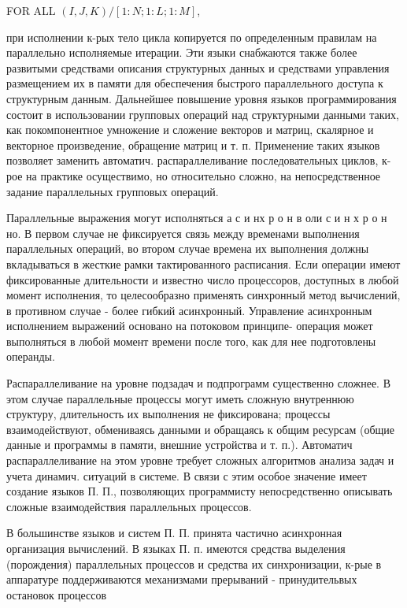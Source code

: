 \documentclass[10pt]{article}
\begin{document}
FOR ALL $(I, J, K) /[1: N ; 1: L ; 1: M]$,



при исполнении к-рых тело цикла копируется по определенным правилам на параллельно исполняемые итерации. Эти языки снабжаются также более развитыми средствами описания структурных данных и средствами управления размещением их в памяти для обеспечения быстрого параллельного доступа к структурным данным. Дальнейшее повышение уровня языков программирования состоит в использовании групповых операций над структурными данными таких, как покомпонентное умножение и сложение векторов и матриц, скалярное и векторное произведение, обращение матриц и т. п. Применение таких языков позволяет заменить автоматич. распараллеливание последовательных циклов, к-рое на практике осуществимо, но относительно сложно, на непосредственное задание параллельных групповых операций.



Параллельные выражения могут исполняться а с и нх р о н в оли с и н х р о н но. В первом случае не фиксируется связь между временами выполнения параллельных операций, во втором случае времена их выполнения должны вкладываться в жесткие рамки тактированного расписания. Если операции имеют фиксированные длительности и известно число процессоров, доступных в любой момент исполнения, то целесообразно применять синхронный метод вычислений, в противном случае - более гибкий асинхронный. Управление асинхронным исполнением выражений основано на потоковом принципе- операция может выполняться в любой момент времени после того, как для нее подготовлены операнды.



Распараллеливание на уровне подзадач и подпрограмм существенно сложнее. В этом случае параллельные процессы могут иметь сложную внутреннюю структуру, длительность их выполнения не фиксирована; процессы взаимодействуют, обмениваясь данными и обращаясь к общим ресурсам (общие данные и программы в памяти, внешние устройства и т. п.). Автоматич распараллеливание на этом уровне требует сложных алгоритмов анализа задач и учета динамич. ситуаций в системе. В связи с этим особое значение имеет создание языков П. П., позволяющих программисту непосредственно описывать сложные взаимодействия параллельных процессов.



В большинстве языков и систем П. П. принята частично асинхронная организация вычислений. В языках П. п. имеются средства выделения (порождения) параллельных процессов и средства их синхронизации, к-рые в аппаратуре поддерживаются механизмами прерываний - принудительвых остановок процессов
\end{document}
